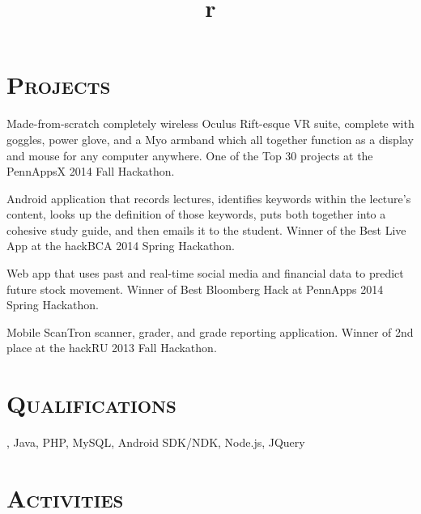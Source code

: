 \begin{resume}
\section{\textsc{Projects}}

\begin{position}
Made-from-scratch completely wireless Oculus Rift-esque VR suite, complete with goggles, power glove, and a Myo armband which all together function as a display and mouse for any computer anywhere. One of the Top 30 projects at the PennAppsX 2014 Fall Hackathon.
\end{position}

\begin{position}
Android application that records lectures, identifies keywords within the lecture's content, looks up the definition of those keywords, puts both together into a cohesive study guide, and then emails it to the student. Winner of the Best Live App at the hackBCA 2014 Spring Hackathon. 
\end{position}

\begin{position}
Web app that uses past and real-time social media and financial data to predict future stock movement. Winner of Best Bloomberg Hack at PennApps 2014 Spring Hackathon.
\end{position}

\begin{position}
Mobile ScanTron scanner, grader, and grade reporting application. Winner of 2nd place at the hackRU 2013 Fall Hackathon.
\end{position}

\section{\textsc{Qualifications}}
\Cplusplus, Java, PHP, MySQL, Android SDK/NDK, Node.js, JQuery
\section{\textsc{Activities}}

\begin{formatb}
  \title{r}\\
  \body\\
\end{formatb}


\end{resume}
